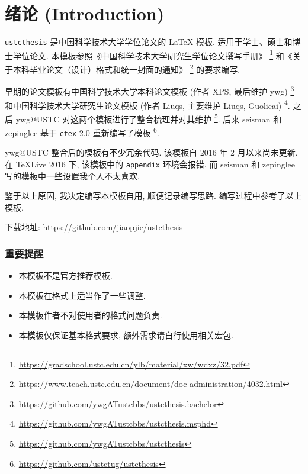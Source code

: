\chapter{绪论 (Introduction)}

\verb|ustcthesis| 是中国科学技术大学学位论文的 \LaTeX{} 模板.
适用于学士、硕士和博士学位论文.
本模板参照《中国科学技术大学研究生学位论文撰写手册》
\footnote{\url{https://gradschool.ustc.edu.cn/ylb/material/xw/wdxz/32.pdf}}
和《关于本科毕业论文（设计）格式和统一封面的通知》
\footnote{\url{https://www.teach.ustc.edu.cn/document/doc-administration/4032.html}}
的要求编写.

早期的论文模板有中国科学技术大学本科论文模板 (作者 XPS, 最后维护 ywg)
\footnote{\url{https://github.com/ywgATustcbbs/ustcthesis.bachelor}}
和中国科学技术大学研究生论文模板 (作者 Liuqs, 主要维护 Liuqs, Guolicai)
\footnote{\url{https://github.com/ywgATustcbbs/ustcthesis.msphd}}.
之后 ywg@USTC 对这两个模板进行了整合梳理并对其维护
\footnote{\url{https://github.com/ywgATustcbbs/ustcthesis}}.
后来 seisman 和 zepinglee 基于 \verb|ctex| 2.0 重新编写了模板
\footnote{\url{https://github.com/ustctug/ustcthesis}}.

ywg@USTC 整合后的模板有不少冗余代码.
该模板自 2016 年 2 月以来尚未更新.
在 TeXLive 2016 下, 该模板中的 \verb|appendix| 环境会报错.
而 seisman 和 zepinglee 写的模板中一些设置我个人不太喜欢.

鉴于以上原因, 我决定编写本模板自用, 顺便记录编写思路.
编写过程中参考了以上模板.

下载地址: \url{https://github.com/jiaopjie/ustcthesis}

\subsection*{重要提醒}

\begin{itemize}
  \item
    本模板\textsf{不是}官方推荐模板.
  \item
    本模板在格式上适当作了一些调整.
  \item
    本模板作者\textsf{不对}使用者的格式问题负责.
  \item
    本模板仅保证基本格式要求, 额外需求请自行使用相关宏包.
\end{itemize}
